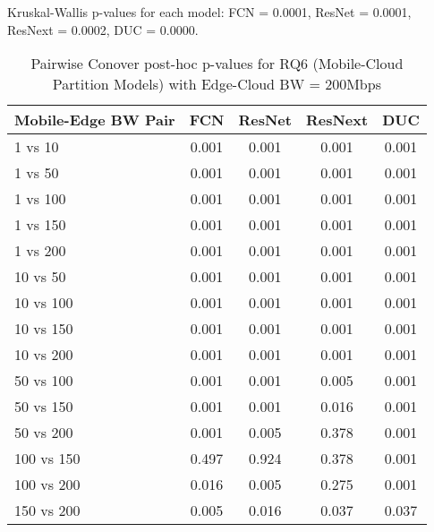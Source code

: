 \begin{table}[h]
\centering
\caption{Pairwise Conover post-hoc p-values for RQ6 (Mobile-Cloud Partition Models) with Edge-Cloud BW = 200Mbps}
\label{tab:conover_mobile_cloud_partition_ec200}
\smallskip
Kruskal-Wallis p-values for each model: FCN = 0.0001, ResNet = 0.0001, ResNext = 0.0002, DUC = 0.0000.

\begin{tabular}{lcccc}
\toprule
Mobile-Edge BW Pair & FCN & ResNet & ResNext & DUC \\
\midrule
1 vs 10 & 0.001 & 0.001 & 0.001 & 0.001 \\
1 vs 50 & 0.001 & 0.001 & 0.001 & 0.001 \\
1 vs 100 & 0.001 & 0.001 & 0.001 & 0.001 \\
1 vs 150 & 0.001 & 0.001 & 0.001 & 0.001 \\
1 vs 200 & 0.001 & 0.001 & 0.001 & 0.001 \\
10 vs 50 & 0.001 & 0.001 & 0.001 & 0.001 \\
10 vs 100 & 0.001 & 0.001 & 0.001 & 0.001 \\
10 vs 150 & 0.001 & 0.001 & 0.001 & 0.001 \\
10 vs 200 & 0.001 & 0.001 & 0.001 & 0.001 \\
50 vs 100 & 0.001 & 0.001 & 0.005 & 0.001 \\
50 vs 150 & 0.001 & 0.001 & 0.016 & 0.001 \\
50 vs 200 & 0.001 & 0.005 & 0.378 & 0.001 \\
100 vs 150 & 0.497 & 0.924 & 0.378 & 0.001 \\
100 vs 200 & 0.016 & 0.005 & 0.275 & 0.001 \\
150 vs 200 & 0.005 & 0.016 & 0.037 & 0.037 \\
\bottomrule
\end{tabular}
\end{table}

